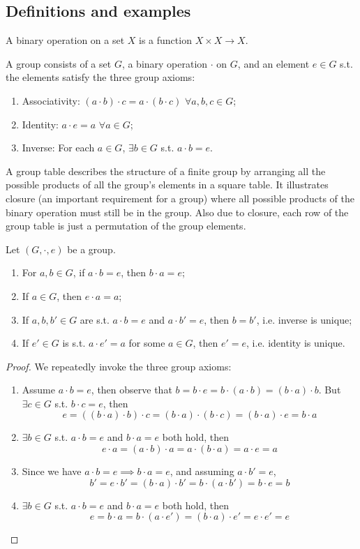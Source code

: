 \documentclass[a4paper]{article}
\begin{document}
\subsection{Definitions and examples}
\begin{defi}
A binary operation on a set $X$ is a function $X\times X\rightarrow X$.
\end{defi}
\begin{defi}[Group]
A group consists of a set $G$, a binary operation $\cdot$ on $G$, and an element $e\in G$ s.t. the elements satisfy the three group axioms:
\begin{enumerate}
    \item Associativity: $(a\cdot b)\cdot c=a\cdot(b\cdot c)$ $\forall a,b,c\in G$;
    \item Identity: $a\cdot e=a$ $\forall a\in G$;
    \item Inverse: For each $a\in G$, $\exists b\in G$ s.t. $a\cdot b=e$.
\end{enumerate}
\end{defi}
\begin{defi}
A group table describes the structure of a finite group by arranging all the possible products of all the group's elements in a square table. It illustrates closure (an important requirement for a group) where all possible products of the binary operation must still be in the group. Also due to closure, each row of the group table is just a permutation of the group elements.
\end{defi}
\begin{thm}
Let $(G,\cdot, e)$ be a group.
\begin{enumerate}
    \item For $a,b\in G$, if $a\cdot b=e$, then $b\cdot a=e$;
    \item If $a\in G$, then $e\cdot a=a$;
    \item If $a,b,b'\in G$ are s.t. $a\cdot b=e$ and $a\cdot b'=e$, then $b=b'$, i.e. inverse is unique;
    \item If $e'\in G$ is s.t. $a\cdot e'=a$ for some $a\in G$, then $e'=e$, i.e. identity is unique.
\end{enumerate}
\end{thm}
\begin{proof}
We repeatedly invoke the three group axioms:
\begin{enumerate}
    \item Assume $a\cdot b=e$, then observe that $b=b\cdot e=b\cdot(a\cdot b)=(b\cdot a)\cdot b$. But $\exists c\in G$ s.t. $b\cdot c=e$, then $$e=((b\cdot a)\cdot b)\cdot c=(b\cdot a)\cdot (b\cdot c)=(b\cdot a)\cdot e=b\cdot a$$
    \item $\exists b\in G$ s.t. $a\cdot b=e$ and $b\cdot a=e$ both hold, then
    $$e\cdot a=(a\cdot b)\cdot a=a\cdot (b\cdot a)=a\cdot e=a$$
    \item Since we have $a\cdot b=e\implies b\cdot a=e$, and assuming $a\cdot b'=e$,
    $$b'=e\cdot b'=(b\cdot a)\cdot b'=b\cdot(a\cdot b')=b\cdot e=b$$
    \item $\exists b\in G$ s.t. $a\cdot b=e$ and $b\cdot a=e$ both hold, then
    $$e=b\cdot a=b\cdot(a\cdot e')=(b\cdot a)\cdot e'=e\cdot e'=e$$
\end{enumerate}
\end{proof}
\end{document}

